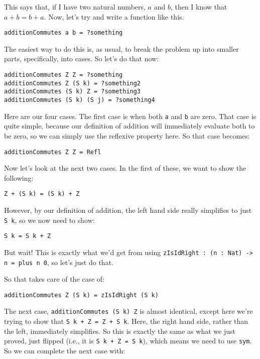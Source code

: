 \documentclass{article}
\newcommand{\inline}[1]{\texttt{#1}}
\begin{document}
This says that, if I have two natural numbers, $a$ and $b$, then I know that $a + b = b + a$.
Now, let’s try and write a function like this.

\begin{verbatim}
additionCommutes a b = ?something
\end{verbatim}

The easiest way to do this is, as usual, to break the problem up into smaller parts, specifically, into cases. So let’s do that now:

\begin{verbatim}
additionCommutes Z Z = ?something
additionCommutes Z (S k) = ?something2
additionCommutes (S k) Z = ?something3
additionCommutes (S k) (S j) = ?something4
\end{verbatim}

Here are our four cases.
The first case is when both \inline{a} and \inline{b} are zero.
That case is quite simple, because our definition of addition will immediately evaluate both to be zero, so we can simply use the reflexive property here.
So that case becomes:

\begin{verbatim}
additionCommutes Z Z = Refl
\end{verbatim}

Now let’s look at the next two cases. In the first of these, we want to show the following:
\begin{verbatim}
Z + (S k) = (S k) + Z
\end{verbatim}

However, by our definition of addition, the left hand side really simplifies to just \inline{S k}, so we now need to show:

\begin{verbatim}
S k = S k + Z
\end{verbatim}

But wait!
This is exactly what we'd get from using \inline{zIsIdRight : (n : Nat) -> n = plus n 0}, so let's just do that.

So that takes care of the case of:

\begin{verbatim}
additionCommutes Z (S k) = zIsIdRight (S k)
\end{verbatim}

The next case, \inline{additionCommutes (S k) Z} is almost identical, except here we’re trying to show that \inline{S k + Z = Z + S k}.
Here, the right hand side, rather than the left, immediately simplifies.
So this is exactly the same as what we just proved, just flipped (i.e., it is \inline{S k + Z = S k}), which means we need to use \inline{sym}.
So we can complete the next case with:
\end{document}
